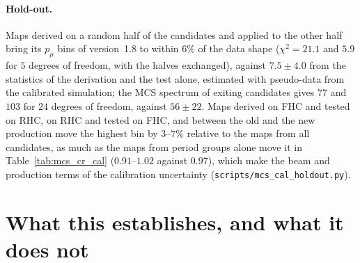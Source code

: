\documentclass[11pt,a4paper]{article}
\begin{document}
\paragraph{Hold-out.} Maps derived on a random half of the candidates and applied to the other half bring its $p_\mu$
bins of version~1.8 to within $6\%$ of the data shape ($\chi^2=21.1$ and $5.9$ for $5$ degrees of freedom, with the
halves exchanged), against $7.5\pm4.0$ from the statistics of the derivation and the test alone, estimated with
pseudo-data from the calibrated simulation; the MCS spectrum of exiting candidates gives $77$ and $103$ for $24$
degrees of freedom, against $56\pm22$. Maps derived on FHC and tested on RHC, on RHC and tested on FHC, and between the
old and the new production move the highest bin by $3$--$7\%$ relative to the maps from all candidates, as much as the
maps from period groups alone move it in Table~\ref{tab:mcs_cr_cal} ($0.91$--$1.02$ against $0.97$), which make the
beam and production terms of the calibration uncertainty (\texttt{scripts/mcs\_cal\_holdout.py}).

\section{What this establishes, and what it does not}
\label{sec:conclusions}
\end{document}
